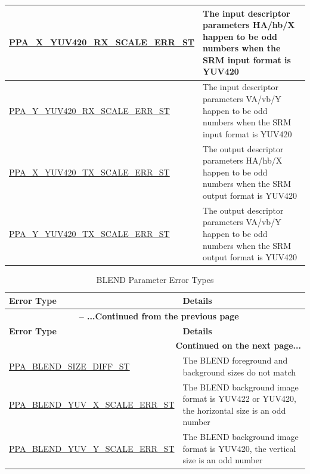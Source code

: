 \documentclass[main\_\_EN.tex]{subfiles}
\begin{document}
\begin{longtable}[c]{ |p{6cm}|p{10cm}| }
        \hyperref[fielddesc:PPAXYUV420RXSCALEERRST]{PPA\_X\_YUV420\_RX\_SCALE\_ERR\_ST} & The input descriptor parameters HA/hb/X happen to be odd numbers when the SRM input format is YUV420  \\\hline
        \hyperref[fielddesc:PPAYYUV420RXSCALEERRST]{PPA\_Y\_YUV420\_RX\_SCALE\_ERR\_ST} & The input descriptor parameters VA/vb/Y happen to be odd numbers when the SRM input format is YUV420 \\\hline
        \hyperref[fielddesc:PPAXYUV420TXSCALEERRST]{PPA\_X\_YUV420\_TX\_SCALE\_ERR\_ST} & The output descriptor parameters HA/hb/X happen to be odd numbers when the SRM output format is YUV420 \\\hline
        \hyperref[fielddesc:PPAYYUV420TXSCALEERRST]{PPA\_Y\_YUV420\_TX\_SCALE\_ERR\_ST} & The output descriptor parameters VA/vb/Y happen to be odd numbers when the SRM output format is YUV420 \\\hline

\end{longtable}

\begin{longtable}[c]{ |p{6cm}|p{10cm}| }
    \caption{BLEND Parameter Error Types}
    \label{tab:blend_param_err}\\\hline

    \rowcolor{lightgray}
    \textbf{Error Type} & \textbf{Details} \\\hline
    \endfirsthead

    \multicolumn{2}{c}{\bfseries \tablename\ \thetable{} -- ...Continued from the previous page}\\\hline
    \rowcolor{lightgray}
    \textbf{Error Type} & \textbf{Details} \\\hline
    \endhead

    \multicolumn{2}{r}{\textbf{Continued on the next page...}} \\
    \endfoot

    \endlastfoot

        \hyperref[fielddesc:PPABLENDSIZEDIFFST]{PPA\_BLEND\_SIZE\_DIFF\_ST} & The BLEND foreground and background sizes do not match \\\hline
        \hyperref[fielddesc:PPABLENDYUVXSCALEERRST]{PPA\_BLEND\_YUV\_X\_SCALE\_ERR\_ST} & The BLEND background image format is YUV422 or YUV420, the horizontal size is an odd number \\\hline
        \hyperref[fielddesc:PPABLENDYUVYSCALEERRST]{PPA\_BLEND\_YUV\_Y\_SCALE\_ERR\_ST} & The BLEND background image format is YUV420, the vertical size is an odd number \\\hline

\end{longtable}
\end{document}

